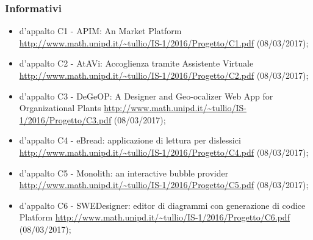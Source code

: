 \documentclass[../StudiodiFattibilita.tex]{subfiles}
\begin{document}
			\subsubsection{Informativi}
			\begin{itemize}
				\item {} d'appalto C1 - APIM: An  Market Platform 
				\url{http://www.math.unipd.it/~tullio/IS-1/2016/Progetto/C1.pdf} (08/03/2017);
				\item {} d'appalto C2 - AtAVi: Accoglienza tramite Assistente Virtuale 
				\url{http://www.math.unipd.it/~tullio/IS-1/2016/Progetto/C2.pdf} (08/03/2017);
				\item {} d'appalto C3 - DeGeOP: A Designer and Geo-ocalizer Web App for Organizational Plants 
				\url{http://www.math.unipd.it/~tullio/IS-1/2016/Progetto/C3.pdf} (08/03/2017);
				\item {} d'appalto C4 - eBread: applicazione di lettura per dislessici 
				\url{http://www.math.unipd.it/~tullio/IS-1/2016/Progetto/C4.pdf} (08/03/2017);
				\item {} d'appalto C5 - Monolith: an interactive bubble provider 
				\url{http://www.math.unipd.it/~tullio/IS-1/2016/Progetto/C5.pdf} (08/03/2017);
				\item {} d'appalto C6 - SWEDesigner: editor di diagrammi  con generazione di codice Platform 
				\url{http://www.math.unipd.it/~tullio/IS-1/2016/Progetto/C6.pdf} (08/03/2017);
			\end{itemize}
\end{document}
